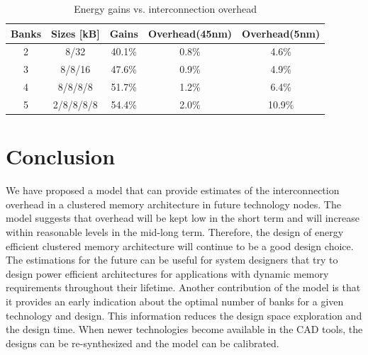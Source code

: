 \begin{center}
	\begin{table}
	\centering
	\caption{Energy gains vs. interconnection overhead}
	\label{tab:GainvsOverhead}
	{
	\begin{tabular}{|c|c|c|c|c|}
	\hline
	Banks & Sizes [kB] & Gains & Overhead(45nm) & Overhead(5nm) \\
	\hline
	2 & 8/32 & 40.1\%   & 0.8\%  & 4.6\%  \\
	\hline 
	3 & 8/8/16 & 47.6\%   & 0.9\%  & 4.9\% \\
	\hline 
	4 & 8/8/8/8 & 51.7\% & 1.2\% & 6.4\% \\
	\hline
	5 & 2/8/8/8/8 & 54.4\% & 2.0\% & 10.9\% \\
	\hline	
	\end{tabular}}
	\end{table}
\end{center}
  
\section{Conclusion}
\label{conclusionE}

We have proposed a model that can provide estimates of the interconnection overhead in a clustered memory architecture in future technology nodes.
The model suggests that overhead will be kept low in the short term and will increase within reasonable levels in the mid-long term.
Therefore, the design of energy efficient clustered memory architecture will continue to be a good design choice.
The estimations for the future can be useful for system designers that try to design power efficient architectures for applications with dynamic memory requirements throughout their lifetime.
Another contribution of the model is that it provides an early indication about the optimal number of banks for a given technology and design.
This information reduces the design space exploration and the design time. 
When newer technologies become available in the CAD tools, the designs can be re-synthesized and the model can be calibrated.




%
